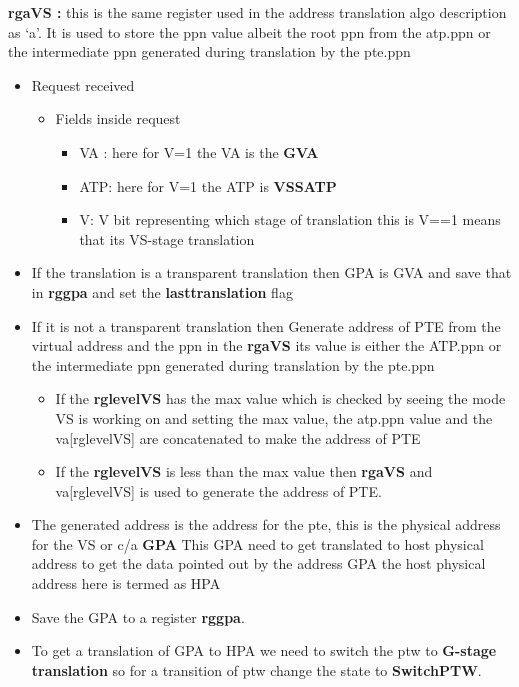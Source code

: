 \documentclass{article}
\begin{document}
\textbf{rg\textunderscore a\textunderscore VS :}  this is the same register used in the address translation algo description as ‘a’. It is used to store the ppn value albeit the root ppn from the atp.ppn or the intermediate ppn generated during translation by the pte.ppn 

\begin{itemize}


\item Request received
\begin{itemize}
\item Fields inside request
\begin{itemize}	
	\item VA : here for V=1 the VA is the \textbf{GVA}
	\item ATP: here for V=1 the ATP is \textbf{VSSATP}
	\item V: V bit representing which stage of translation this is  V==1 means that its VS-stage translation
\end{itemize}
	
\end{itemize}
	

\item If the translation is a transparent translation then GPA is GVA and save that in \textbf{rg\textunderscore gpa} and set the \textbf{last\textunderscore translation} flag  
\item If it is not a transparent translation then Generate address of PTE from the virtual address and the ppn in the  \textbf{rg\textunderscore a\textunderscore VS} its value is either the ATP.ppn or the  intermediate ppn generated during translation by the pte.ppn 
\begin{itemize}
\item If the \textbf{rg\textunderscore level\textunderscore VS} has the max value which is checked by seeing the mode VS is working on and setting the max value, the atp.ppn value and the va[rg\textunderscore level\textunderscore VS] are concatenated to make the address of PTE
\item If the \textbf{rg\textunderscore level\textunderscore VS}  is less than the max value then \textbf{rg\textunderscore a\textunderscore VS} and va[rg\textunderscore level\textunderscore VS] is used to generate the address of PTE.
\end{itemize}

\item The generated address is the address for the pte, this is the physical address for the VS or c/a \textbf{GPA} 
This GPA need to get translated to host physical address to get the data pointed out by the address GPA the host physical address here is termed as HPA 
\item Save the GPA to a register \textbf{rg\textunderscore gpa}.
\item To get a translation of GPA to HPA we need to switch the ptw to \textbf{G-stage translation} so for a transition of ptw change the state to \textbf{SwitchPTW}.
\end{itemize}
\end{document}
